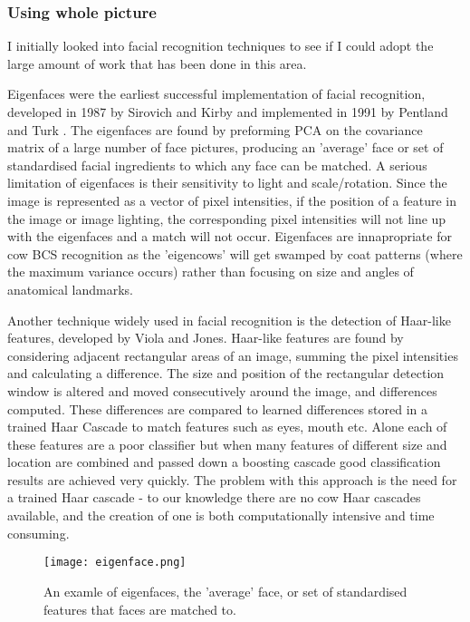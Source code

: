 \documentclass[11pt]{article}
\begin{document}
	\subsubsection{Using whole picture}
	I initially looked into facial recognition techniques to see if I could adopt the large amount of work that has been done in this area.


	Eigenfaces were the earliest successful implementation of facial recognition, developed in 1987 by Sirovich and Kirby and implemented in 1991 by Pentland and Turk \cite{Turk1991}.
	The eigenfaces are found by preforming PCA on the covariance matrix of a large number of face pictures, producing an 'average' face or set of standardised facial ingredients to which any face can be matched.
	A serious limitation of eigenfaces is their sensitivity to light and scale/rotation. 
	Since the image is represented as a vector of pixel intensities, if the position of a feature in the image or image lighting, the corresponding pixel intensities will not line up with the eigenfaces and a match will not occur.
	Eigenfaces are innapropriate for cow BCS recognition as the 'eigencows' will get swamped by coat patterns (where the maximum variance occurs) rather than focusing on size and angles of anatomical landmarks.



	Another technique widely used in facial recognition is the detection of Haar-like features, developed by Viola and Jones\cite{viola2004}.
	Haar-like features are found by considering adjacent rectangular areas of an image, summing the pixel intensities and calculating a difference. 
	The size and position of the rectangular detection window is altered and moved consecutively around the image, and differences computed.
	These differences are compared to learned differences stored in a trained Haar Cascade to match features such as eyes, mouth etc.
	Alone each of these features are a poor classifier but when many features of different size and location are combined and passed down a boosting cascade good classification results are achieved very quickly.
	The problem with this approach is the need for a trained Haar cascade - to our knowledge there are no cow Haar cascades available, and the creation of one is both computationally intensive and time consuming.
	
	\begin{figure}[b!]
		\centering
		\texttt{[image: eigenface.png]}
		\caption{An examle of eigenfaces, the 'average' face, or set of standardised features that faces are matched to.}
		\label{fig:<+label+>}
	\end{figure}
\newpage
\end{document}

